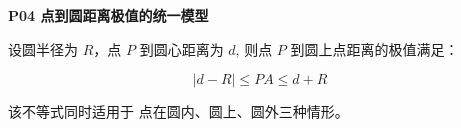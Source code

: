 \begin{statementbox}
\textbf{P04 点到圆距离极值的统一模型}

设圆半径为 $R$，点 $P$ 到圆心距离为 $d$,
则点 $P$ 到圆上点距离的极值满足：

\[
|d-R| \le PA \le d+R
\]

该不等式同时适用于
点在圆内、圆上、圆外三种情形。
\end{statementbox}
